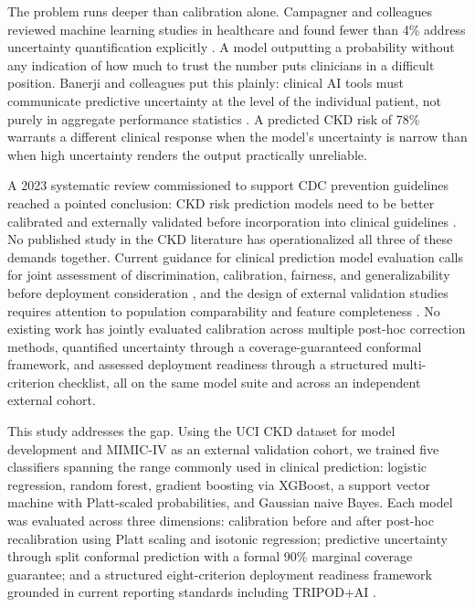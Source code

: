 The problem runs deeper than calibration alone. Campagner and colleagues
reviewed machine learning studies in healthcare and found fewer than 4\% address
uncertainty quantification explicitly \citep{Campagner2025}. A model outputting
a probability without any indication of how much to trust the number puts
clinicians in a difficult position. Banerji and colleagues put this plainly:
clinical AI tools must communicate predictive uncertainty at the level of the
individual patient, not purely in aggregate performance statistics
\citep{Banerji2023}. A predicted CKD risk of 78\% warrants a different clinical
response when the model's uncertainty is narrow than when high uncertainty
renders the output practically unreliable.

A 2023 systematic review commissioned to support CDC prevention guidelines
reached a pointed conclusion: CKD risk prediction models need to be better
calibrated and externally validated before incorporation into clinical guidelines
\citep{GonzalezRocha2023}. No published study in the CKD literature has
operationalized all three of these demands together. Current guidance for clinical
prediction model evaluation calls for joint assessment of discrimination,
calibration, fairness, and generalizability before deployment consideration
\citep{Collins2024EvalPart1}, and the design of external validation studies
requires attention to population comparability and feature completeness
\citep{Riley2024EvalPart2}. No existing work has jointly
evaluated calibration across multiple post-hoc correction methods, quantified
uncertainty through a coverage-guaranteed conformal framework, and assessed
deployment readiness through a structured multi-criterion checklist, all on the
same model suite and across an independent external cohort.

This study addresses the gap. Using the UCI CKD dataset for model development
and MIMIC-IV as an external validation cohort, we trained five classifiers
spanning the range commonly used in clinical prediction: logistic regression,
random forest, gradient boosting via XGBoost, a support vector machine with
Platt-scaled probabilities, and Gaussian naive Bayes. Each model was evaluated
across three dimensions: calibration before and after post-hoc recalibration
using Platt scaling and isotonic regression; predictive uncertainty through split
conformal prediction with a formal 90\% marginal coverage guarantee; and a
structured eight-criterion deployment readiness framework grounded in current
reporting standards including TRIPOD+AI \citep{Collins2024TRIPOD}.

